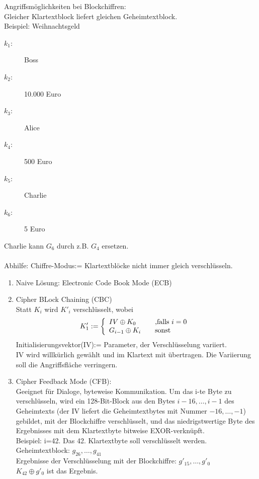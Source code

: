 \documentclass[a4paper,12pt]{article}
\begin{document}
Angriffsmöglichkeiten bei Blockchiffren:\\
Gleicher Klartextblock liefert gleichen Geheimtextblock.\\
Beispiel: Weihnachtsgeld
\begin{description}
 \item[$k_1$:] Boss
 \item[$k_2$:] 10.000 Euro
 \item[$k_3$:] Alice
 \item[$k_4$:] 500 Euro
 \item[$k_5$:] Charlie
 \item[$k_6$:] 5 Euro
\end{description}
Charlie kann $G_6$ durch z.B. $G_4$ ersetzen.\\
\\
Abhilfe: Chiffre-Modus:= Klartextblöcke nicht immer gleich verschlüsseln.\\
\begin{enumerate}
 \item Naive Lösung: Electronic Code Book Mode (ECB)
 \item Cipher BLock Chaining (CBC)\\
 Statt $K_i$ wird $K'_i$ verschlüsselt, wobei
 $$  K'_1 := \left\{ 
  \begin{array}{l l}
    IV\oplus K_0 & \quad \text{,falls $i=0$ }\\
    G_{i-1}\oplus K_i & \quad \text{sonst}\\
  \end{array} \right.
$$
Initialisierungsvektor(IV):= Parameter, der Verschlüsselung variiert.\\
IV wird willkürlich gewählt und im Klartext mit übertragen. Die Variierung soll die Angriffsfläche verringern.
\item Cipher Feedback Mode (CFB):\\
Geeignet für Dialoge, byteweise Kommunikation. Um das i-te Byte zu verschlüsseln, wird ein 128-Bit-Block aus den Bytes $i-16,\dots,i-1$ des Geheimtexts (der IV liefert die Geheimtextbytes mit Nummer $-16,\dots,-1$) gebildet, mit der Blockchiffre verschlüsselt, und das niedrigstwertige Byte des Ergebnisses mit dem Klartextbyte bitweise EXOR-verknüpft.\\
Beispiel: i=42. Das 42. Klartextbyte soll verschlüsselt werden.\\
Geheimtextblock: $g_{26},\dots,g_{41}$\\
Ergebnisse der Verschlüsselung mit der Blockchiffre: $g'_{15},\dots,g'_{0}$\\
$K_{42}\oplus g'_0$ ist das Ergebnis.
\end{enumerate}
\end{document}
